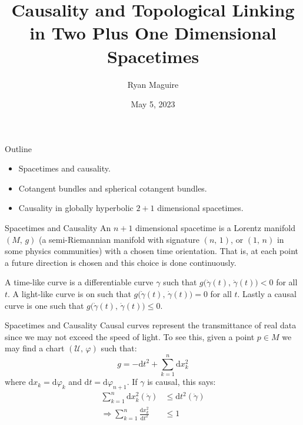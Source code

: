 \documentclass{beamer}
\title{Causality and Topological Linking in Two Plus One Dimensional Spacetimes}
\author{Ryan Maguire}
\date{May 5, 2023}
\begin{document}
    \maketitle
    \begin{frame}{Outline}
        \begin{itemize}
            \item Spacetimes and causality.
            \item Cotangent bundles and spherical cotangent bundles.
            \item Causality in globally hyperbolic $2+1$ dimensional spacetimes.
        \end{itemize}
    \end{frame}
    \begin{frame}{Spacetimes and Causality}
        An $n+1$ dimensional spacetime is a Lorentz manifold $(M,\,g)$
        (a semi-Riemannian manifold with signature $(n,\,1)$, or $(1,\,n)$ in
        some physics communities) with a chosen time orientation. That is, at
        each point a future direction is chosen and this choice is done
        continuously.
        \par\hfill\par
        A time-like curve is a differentiable curve $\gamma$ such that
        $g\big(\dot{\gamma}(t),\,\dot{\gamma}(t)\big)<0$ for all $t$. A
        light-like curve is on such that
        $g\big(\dot{\gamma}(t),\,\dot{\gamma}(t)\big)=0$ for all $t$. Lastly a
        causal curve is one such that
        $g\big(\dot{\gamma}(t),\,\dot{\gamma}(t)\big)\leq{0}$.
    \end{frame}
    \begin{frame}{Spacetimes and Causality}
        Causal curves represent the transmittance of real data since we may not
        exceed the speed of light. To see this, given a point $p\in{M}$ we may
        find a chart $(\mathcal{U},\,\varphi)$ such that:
        \begin{equation}
            g=-\textrm{d}t^{2}+\sum_{k=1}^{n}\textrm{d}x_{k}^{2}
        \end{equation}
        where $\textrm{d}x_{k}=\textrm{d}\varphi_{k}$ and
        $\textrm{d}t=\textrm{d}\varphi_{n+1}$. If $\gamma$ is causal, this says:
        \begin{align}
            \sum_{k=1}^{n}\textrm{d}x_{k}^{2}(\dot{\gamma})
                &\leq\textrm{d}t^{2}(\dot{\gamma})\\
            \Rightarrow
            \sum_{k=1}^{n}\frac{\textrm{d}x_{k}^{2}}{\textrm{d}t^{2}}&\leq{1}
        \end{align}
    \end{frame}
\end{document}
